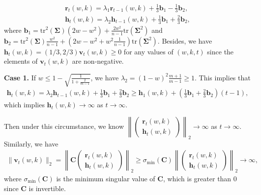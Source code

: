 \begin{align}
\bm{r}_t(w,k)=\lambda_1  \bm{r}_{t-1}(w,k)+\frac{1}{3}\bm{b}_1-\frac{1}{3}\bm{b}_2,  \label{r_t_iteration}\\
\bm{h}_t(w,k)=\lambda_2  \bm{h}_{t-1}(w,k)+\frac{1}{3}\bm{b}_1+\frac{2}{3}\bm{b}_2, \label{h_t_iteration}
\end{align}
where $\bm{b}_1=\mathrm{tr}^2(\bm{\Sigma})(2w-w^2)+\frac{2w^2}{n-1}\mathrm{tr}(\bm{\Sigma}^2)$ and $\bm{b}_2=\mathrm{tr}^2(\bm{\Sigma})\frac{w^2}{n-1}+(2w-w^2+w^2\frac{1}{n-1})\mathrm{tr}(\bm{\Sigma}^2)$.
Besides, we have $\bm{h}_t(w,k)=(1/3,2/3)\bm{v}_t(w,k)\geq 0$ for any values of $(w,k,t)$ since the elements of $\bm{v}_t(w,k)$ are non-negative.


\noindent
\textbf{Case 1.} If $w\leq 1-\sqrt{\frac{1}{1+\frac{2}{m-1}}}$, we have $\lambda_2=(1-w)^2 \frac{m+1}{m-1}\geq 1$. This implies that
\begin{align*}
\bm{h}_t(w,k)=\lambda_2  \bm{h}_{t-1}(w,k)+\frac{1}{3}\bm{b}_1+\frac{2}{3}\bm{b}_2\geq \bm{h}_{1}(w,k)+\left(\frac{1}{3}\bm{b}_1+\frac{2}{3}\bm{b}_2\right)(t-1),
\end{align*}
which implies $\bm{h}_t(w,k) \to \infty$ as $t \to \infty$. 

Then under this circumstance, we know $\left\|
\begin{pmatrix}
    \bm{r}_t(w, k) \\
    \bm{h}_t(w, k)
\end{pmatrix}
\right\|_2 \to \infty$ as $t \to \infty$. Similarly, we have
\begin{align*}
  \|\bm{v}_t(w,k)\|_2=\left\|\bm{C}\begin{pmatrix}
    \bm{r}_t(w,k) \\ \bm{h}_t(w,k)
\end{pmatrix}\right\|_2\geq \sigma_{\min}(\bm{C})\left\| \begin{pmatrix}
    \bm{r}_t(w,k) \\ \bm{h}_t(w,k)
\end{pmatrix}\right\|_2 \to \infty,
\end{align*}
where $\sigma_{\min}(\bm{C})$ is the minimum singular value of $\bm{C}$, which is greater than 0 since $\bm{C}$ is invertible.

